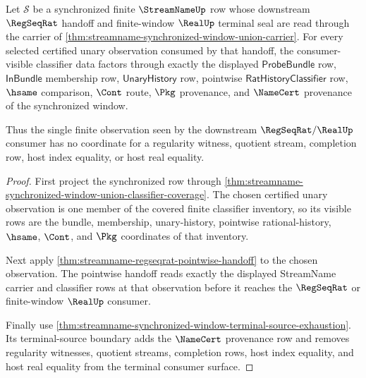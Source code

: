 \begin{theorem}
\label{thm:streamname-finite-observation-classifier-exhaustion}
Let $\mathcal S$ be a synchronized finite $\StreamNameUp$ row whose
downstream $\RegSeqRat$ handoff and finite-window $\RealUp$ terminal seal are
read through the carrier of
\autoref{thm:streamname-synchronized-window-union-carrier}. For every selected
certified unary observation consumed by that handoff, the consumer-visible
classifier data factors through exactly the displayed
$\mathsf{ProbeBundle}$ row, $\mathsf{InBundle}$ membership row,
$\mathsf{UnaryHistory}$ row, pointwise
$\mathsf{RatHistoryClassifier}$ row, $\hsame$ comparison, $\Cont$ route,
$\Pkg$ provenance, and $\NameCert$ provenance of the synchronized window.

Thus the single finite observation seen by the downstream
$\RegSeqRat/\RealUp$ consumer has no coordinate for a regularity witness,
quotient stream, completion row, host index equality, or host real equality.
\end{theorem}
\begin{proof}
First project the synchronized row through
\autoref{thm:streamname-synchronized-window-union-classifier-coverage}. The
chosen certified unary observation is one member of the covered finite
classifier inventory, so its visible rows are the bundle, membership,
unary-history, pointwise rational-history, $\hsame$, $\Cont$, and $\Pkg$
coordinates of that inventory.

Next apply \autoref{thm:streamname-regseqrat-pointwise-handoff} to the chosen
observation. The pointwise handoff reads exactly the displayed StreamName
carrier and classifier rows at that observation before it reaches the
$\RegSeqRat$ or finite-window $\RealUp$ consumer.

Finally use
\autoref{thm:streamname-synchronized-window-terminal-source-exhaustion}. Its
terminal-source boundary adds the $\NameCert$ provenance row and removes
regularity witnesses, quotient streams, completion rows, host index equality,
and host real equality from the terminal consumer surface.
\end{proof}

